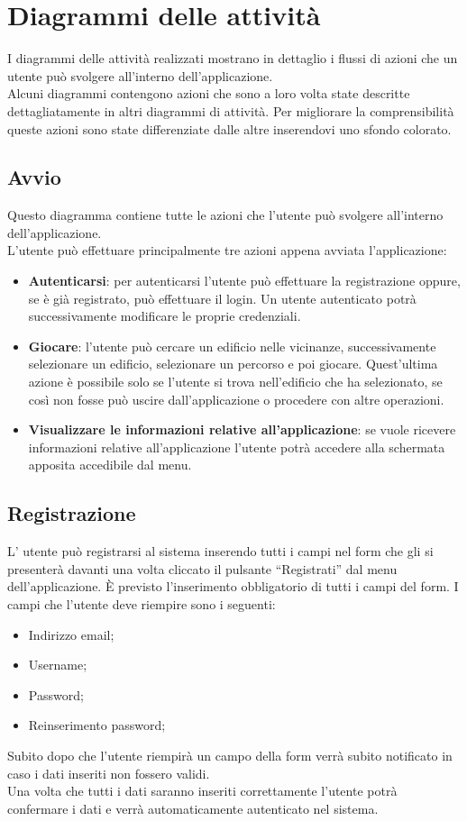 \section{Diagrammi delle attività} 
\label{attivita}
I diagrammi delle attività realizzati mostrano in dettaglio i flussi di azioni che un utente può svolgere all'interno dell'applicazione. \\
Alcuni diagrammi contengono azioni che sono a loro volta state descritte dettagliatamente in altri diagrammi di attività. Per migliorare la comprensibilità queste azioni sono state differenziate dalle altre inserendovi uno sfondo colorato.

\subsection{Avvio}
Questo diagramma contiene tutte le azioni che l'utente può svolgere all'interno dell'applicazione. \\
L'utente può effettuare principalmente tre azioni appena avviata l'applicazione:
\begin{itemize}
	\item \textbf{Autenticarsi}: per autenticarsi l'utente può effettuare la registrazione oppure, se è già registrato, può effettuare il login. Un utente autenticato potrà successivamente modificare le proprie credenziali.
	\item \textbf{Giocare}: l'utente può cercare un edificio nelle vicinanze, successivamente selezionare un edificio, selezionare un percorso e poi giocare. Quest'ultima azione è possibile solo se l'utente si trova nell'edificio che ha selezionato, se così non fosse può uscire dall'applicazione o procedere con altre operazioni.
	\item \textbf{Visualizzare le informazioni relative all'applicazione}: se vuole ricevere informazioni relative all'applicazione l'utente potrà accedere alla schermata apposita accedibile dal menu.
\end{itemize}


\subsection{Registrazione}
L' utente può registrarsi al sistema inserendo tutti i campi nel form che gli si presenterà davanti una volta cliccato il pulsante ``Registrati'' dal menu dell'applicazione. È previsto l'inserimento obbligatorio di tutti i campi del form.
I campi che l'utente deve riempire sono i seguenti:
\begin{itemize}
	\item Indirizzo email;
	\item Username;
	\item Password;
	\item Reinserimento password;
\end{itemize}
Subito dopo che l'utente riempirà un campo della form verrà subito notificato in caso i dati inseriti non fossero validi. \\
Una volta che tutti i dati saranno inseriti correttamente l'utente potrà confermare i dati e verrà automaticamente autenticato nel sistema.

